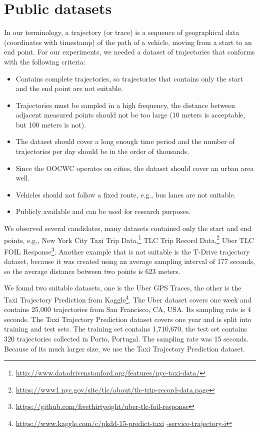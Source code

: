 \documentclass[b5paper,12pt]{report}
\theoremstyle{definition}
\begin{document}
\section{Public datasets}
\label{public-dataset}

In our terminology, a trajectory (or trace) is a sequence of geographical data (coordinates with timestamp) of the path of a vehicle, moving from a start to an end point. For our experiments, we needed a dataset of trajectories that conforms with the following criteria:

\begin{itemize}
\item Contains complete trajectories, so trajectories that contains only the start and the end point are not suitable.
\item Trajectories must be sampled in a high frequency, the distance between adjacent measured points should not be too large (10 meters is acceptable, but 100 meters is not).
\item The dataset should cover a long enough time period and the number of trajectories per day should be in the order of thousands.
\item Since the OOCWC operates on cities, the dataset should cover an urban area well.
\item Vehicles should not follow a fixed route, e.g., bus lanes are not suitable.
\item Publicly available and can be used for research purposes.
\end{itemize}

We observed several candidates, many datasets contained only the start and end points, e.g., New York City Taxi Trip Data,\footnote{\url{http://www.datadrivenstanford.org/features/nyc-taxi-data/}} TLC Trip Record Data,\footnote{\url{https://www1.nyc.gov/site/tlc/about/tlc-trip-record-data.page}} Uber TLC FOIL Response\footnote{\url{https://github.com/fivethirtyeight/uber-tlc-foil-response}}. Another example that is not suitable is the T-Drive trajectory dataset, because it was created using an average sampling interval of 177 seconds, so the average distance between two points is 623 meters.

We found two suitable datasets, one is the Uber GPS Traces, the other is the Taxi Trajectory Prediction from Kaggle\footnote{\url{https://www.kaggle.com/c/pkdd-15-predict-taxi} \url{-service-trajectory-i}}. The Uber dataset covers one week and contains 25,000 trajectories from San Francisco, CA, USA. Its sampling rate is 4 seconds. The Taxi Trajectory Prediction dataset covers one year and is split into training and test sets. The training set contains 1,710,670, the test set contains 320 trajectories collected in Porto, Portugal. The sampling rate was 15 seconds. Because of its much larger size, we use the Taxi Trajectory Prediction dataset.
\end{document}
